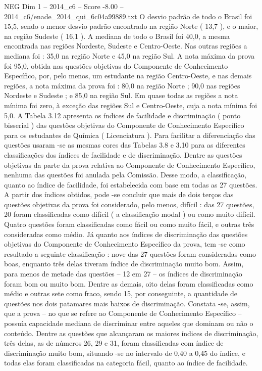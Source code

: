 \begin{textsample}{NEG Dim 1 – 2014\_c6 – Score -8.00 – 2014\_c6/enade\_2014\_qui\_6c04a99889.txt}
O desvio padrão de todo o Brasil foi 15,5, sendo o menor desvio padrão encontrado na região Norte ( 13,7 ), e o maior, na região Sudeste ( 16,1 ).
A mediana de todo o Brasil foi 40,0, a mesma encontrada nas regiões Nordeste, Sudeste e Centro-Oeste.
Nas outras regiões a mediana foi : 35,0 na região Norte e 45,0 na região Sul.
A nota máxima da prova foi 95,0, obtida nas questões objetivas do Componente de Conhecimento Específico, por, pelo menos, um estudante na região Centro-Oeste, e nas demais regiões, a nota máxima da prova foi : 80,0 na região Norte ; 90,0 nas regiões Nordeste e Sudeste ; e 85,0 na região Sul.
Em quase todas as regiões a nota mínima foi zero, à exceção das regiões Sul e Centro-Oeste, cuja a nota mínima foi 5,0.
A Tabela 3.12 apresenta os índices de facilidade e discriminação ( ponto bisserial ) das questões objetivas do Componente de Conhecimento Específico para os estudantes de Química ( Licenciatura ).
Para facilitar a diferenciação das questões usaram -se as mesmas cores das Tabelas 3.8 e 3.10 para as diferentes classificações dos índices de facilidade e de discriminação.
Dentre as questões objetivas da parte da prova relativa ao Componente de Conhecimento Específico, nenhuma das questões foi anulada pela Comissão.
Desse modo, a classificação, quanto ao índice de facilidade, foi estabelecida com base em todas as 27 questões.
A partir dos índices obtidos, pode -se concluir que mais de dois terços das questões objetivas da prova foi considerado, pelo menos, difícil : das 27 questões, 20 foram classificadas como difícil ( a classificação modal ) ou como muito difícil.
Quatro questões foram classificadas como fácil ou como muito fácil, e outras três consideradas como médio.
Já quanto aos índices de discriminação das questões objetivas do Componente de Conhecimento Específico da prova, tem -se como resultado a seguinte classificação : nove das 27 questões foram consideradas como boas, enquanto três delas tiveram índice de discriminação muito bom.
Assim, para menos de metade das questões – 12 em 27 – os índices de discriminação foram bom ou muito bom.
Dentre as demais, oito delas foram classificadas como médio e outras sete como fraco, sendo 15, por conseguinte, a quantidade de questões nos dois patamares mais baixos de discriminação.
Constata -se, assim, que a prova – no que se refere ao Componente de Conhecimento Específico – possuía capacidade mediana de discriminar entre aqueles que dominam ou não o conteúdo.
Dentre as questões que alcançaram os maiores índices de discriminação, três delas, as de números 26, 29 e 31, foram classificadas com índice de discriminação muito bom, situando -se no intervalo de 0,40 a 0,45 do índice, e todas elas foram classificadas na categoria fácil, quanto ao índice de facilidade.

\end{textsample}
